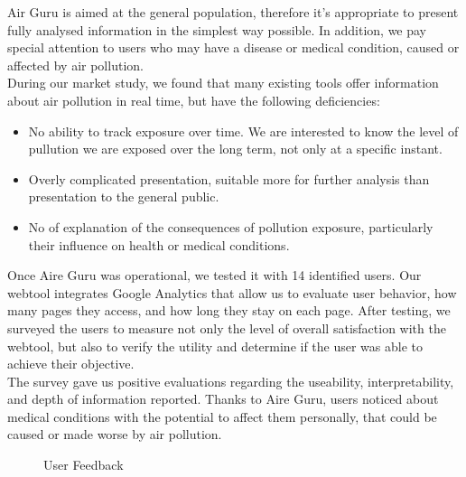 Air Guru is aimed at the general population, therefore it's appropriate to present fully analysed information in the simplest way possible.
In addition, we pay special attention to users who may have a
disease or medical condition, caused or affected by air pollution.\\

During our market study, we found that many existing tools offer information about air pollution in real time, but have the following deficiencies:
\begin{itemize}
    \item No ability to track exposure over time. We are interested to know the level of pullution we are exposed over the long term, not only at a specific instant.
    \item Overly complicated presentation, suitable more for further analysis than presentation to the general public.
    \item No of explanation of the consequences of pollution exposure, particularly their influence on health or medical conditions.
\end{itemize}

Once Aire Guru was operational, we tested it with 14 identified users. Our webtool integrates Google Analytics that allow us to evaluate
user behavior, how many pages they access, and how long they stay on each page.
After testing, we surveyed the users to measure not only the level of overall satisfaction with the webtool,
but also to verify the utility and determine if the user was able to achieve their objective.\\

The survey gave us positive evaluations regarding the useability, interpretability, and depth of information reported. 
Thanks to Aire Guru, users noticed about medical conditions with the potential to affect them personally, that could be caused or made worse by air pollution.\\

\begin{figure}[ht]
    \centering
    \hfill
    \caption{User Feedback}
\end{figure}